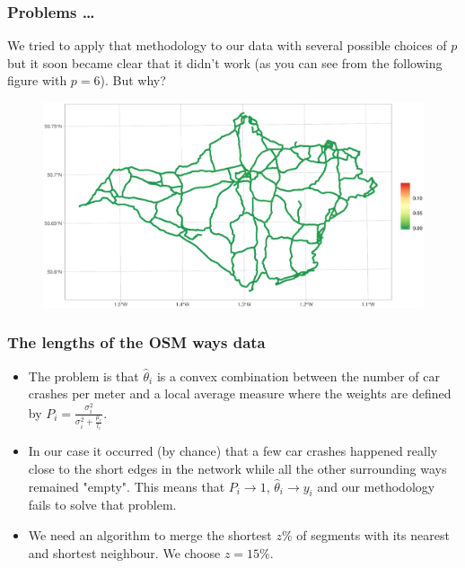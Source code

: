 \documentclass[c,10pt,pdftex]{beamer}
\begin{document}
\begin{frame}
\vspace{-0.25cm}
\frametitle{Problems \dots}
We tried to apply that methodology to our data with several possible choices of $p$ but it soon became clear that it didn't work (as you can see from the following figure with $p = 6$). But why?
\begin{figure}
	\centering
	\includegraphics[width=\linewidth]{images/empirical_bayes_1}
\end{figure}
\end{frame}

\begin{frame}
\frametitle{The lengths of the OSM ways data}
\vspace{-0.75cm}
\begin{itemize}
	\setlength\itemsep{1em}
	\item The problem is that $\hat{\theta}_i$ is a convex combination between the number of car crashes per meter and a local average measure where the weights are defined by $P_i = \frac{\sigma^2_i}{\sigma^2_i + \frac{\mu_i}{l_i}}$. 
	
	\item In our case it occurred (by chance) that a few car crashes happened really close to the short edges in the network while all the other surrounding ways remained "empty". This means that $P_i \to 1$, $\hat{\theta}_i \to y_i$ and our methodology fails to solve that problem.
	
	\item  We need an algorithm to \alert{merge the shortest $z\%$ of segments with its nearest and shortest neighbour}. We choose $z = 15\%$. 
\end{itemize}
\end{frame}
\end{document}
